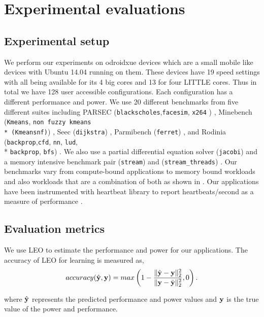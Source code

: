 \section{Experimental evaluations}

\subsection{Experimental setup}

We perform our experiments on odroidxue devices which are a small mobile like devices with Ubuntu 14.04 running on them. These devices have 19 speed settings with all being available for its 4 big cores and 13 for four LITTLE cores. Thus in total we have 128 user accessible configurations. Each configuration has a different performance and power. We use 20 different benchmarks from five different suites including PARSEC
(\texttt{blackscholes},\texttt{facesim}, \texttt{x264} ) \cite{parsec}, 
Minebench
(\texttt{Kmeans},  
\texttt{non fuzzy kmeans \\* (Kmeansnf)}) \cite{minebench}, 
Seec
(\texttt{dijkstra}) \cite{seec}, 
Parmibench
(\texttt{ferret}) \cite{parmibench}, and Rodinia
(\texttt{backprop},\texttt{cfd}, \texttt{nn}, \texttt{lud}, \\* 
\texttt{backprop}, \texttt{bfs}) \cite{rodinia}.  
We also use a
partial differential equation solver (\texttt{jacobi}) and a memory intensive benchmark pair (\texttt{stream}) and (\texttt{stream\_threads}) \cite{stream}. Our benchmarks vary from compute-bound applications to memory bound workloads and also workloads that are a combination of both as shown in .
Our applications have been instrumented with heartbeat library to report heartbeats/second as a measure of performance \cite{poet}.

\subsection{Evaluation metrics}
We use LEO to estimate the performance and power for our applications. The accuracy of LEO for learning is measured as,
\begin{equation}
\label{eq:accuracy}
accuracy(\hat{\mathbf{y}},\mathbf{y}) = max\left(1 - \frac{\| \hat{\mathbf{y}}-\mathbf{y} \|^2_2 }{\| \mathbf{y} - \bar{\mathbf{y}}\|^2_2},0\right).
\end{equation}

where $\hat{\mathbf{y}}$ represents the predicted performance and power values and $\mathbf{y}$ is the true value of the power and performance.

